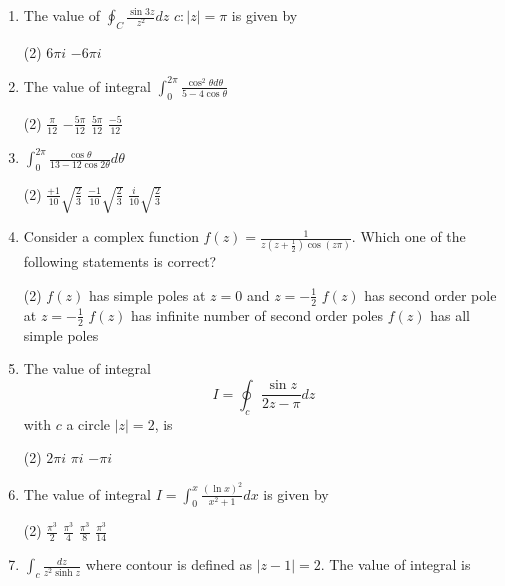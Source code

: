 \begin{enumerate}
	\item The value of $\oint_{C} \frac{\sin 3 z}{z^{2}} d z$
	$c:|z|=\pi$ is given by
	\begin{tasks}(2)
		\task[\textbf{a.}]$6 \pi i$
		\task[\textbf{b.}]$-6 \pi i$
	\end{tasks}
	\item The value of integral $\int_{0}^{2 \pi} \frac{\cos ^{2} \theta d \theta}{5-4 \cos \theta}$
	\begin{tasks}(2)
		\task[\textbf{a.}]$\frac{\pi}{12}$
		\task[\textbf{b.}]$-\frac{5 \pi}{12}$
		\task[\textbf{c.}]$\frac{5 \pi}{12}$
		\task[\textbf{d.}] $\frac{-5}{12}$
	\end{tasks}
	\item $\int_{0}^{2 \pi} \frac{\cos \theta}{13-12 \cos 2 \theta} d \theta$
	\begin{tasks}(2)
		\task[\textbf{b.}]$\frac{+1}{10} \sqrt{\frac{2}{3}}$
		\task[\textbf{c.}] $\frac{-1}{10} \sqrt{\frac{2}{3}}$
		\task[\textbf{d.}]  $\frac{i}{10} \sqrt{\frac{2}{3}}$
	\end{tasks}
	\item Consider a complex function $f(z)=\frac{1}{z\left(z+\frac{1}{2}\right) \cos (z \pi)}$. Which one of the following
	statements is correct?
	\begin{tasks}(2)
		\task[\textbf{a.}] $f(z)$ has simple poles at $z=0$ and $z=-\frac{1}{2}$
		\task[\textbf{b.}]$f(z)$ has second order pole at $z=-\frac{1}{2}$
		\task[\textbf{c.}]$f(z)$ has infinite number of second order poles
		\task[\textbf{d.}] $f(z)$ has all simple poles
	\end{tasks}
	\item The value of integral
	$$
	I=\oint_{c} \frac{\sin z}{2 z-\pi} d z
	$$
	with $c$ a circle $|z|=2$, is
	\begin{tasks}(2)
		\task[\textbf{b.}]$2 \pi i$
		\task[\textbf{c.}]$\pi i$
		\task[\textbf{d.}] $-\pi i$
	\end{tasks}
	\item The value of integral $I=\int_{0}^{x} \frac{(\ln x)^{2}}{x^{2}+1} d x$ is given by
	\begin{tasks}(2)
		\task[\textbf{a.}]$\frac{\pi^{3}}{2}$
		\task[\textbf{b.}]$\frac{\pi^{3}}{4}$
		\task[\textbf{c.}]$\frac{\pi^{3}}{8}$
		\task[\textbf{d.}]  $\frac{\pi^{3}}{14}$
	\end{tasks}
	\item $\int_{c} \frac{d z}{z^{2} \sinh z}$ where contour is defined as $|z-1|=2$. The value of integral is

\end{enumerate}
